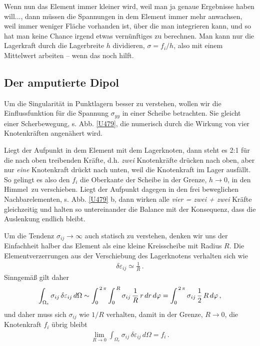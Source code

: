 {Wenn nun das Element immer kleiner wird, weil man ja genaue Ergebnisse haben will..., dann m\"{u}ssen die Spannungen in dem Element immer mehr anwachsen, weil immer weniger Fl\"{a}che vorhanden ist, \"{u}ber die man integrieren kann, und so hat man keine Chance irgend etwas vern\"{u}nftiges zu berechnen. Man kann nur die Lagerkraft durch die Lagerbreite $h$ dividieren, $\sigma = f_i/h$, also mit einem Mittelwert arbeiten -- wenn das noch hilft.



{\textcolor{sectionTitleBlue}{\subsection{Der amputierte Dipol}}}\label{Korrektur22}
Um die Singularit\"{a}t in Punktlagern besser zu verstehen, wollen wir die Einflussfunktion f\"{u}r die Spannung $\sigma_{yy}$ in einer Scheibe betrachten. Sie gleicht einer Scherbewegung, s. Abb. \ref{U479}, die numerisch durch die Wirkung von vier Knotenkr\"{a}ften angen\"{a}hert wird.

Liegt der Aufpunkt in dem Element mit dem Lagerknoten, dann steht es 2:1 f\"{u}r die nach oben treibenden Kr\"{a}fte, d.h. {\em zwei\/} Knotenkr\"{a}fte dr\"{u}cken nach oben, aber nur {\em eine\/} Knotenkraft dr\"{u}ckt nach unten, weil die Knotenkraft im Lager ausf\"{a}llt. So gelingt es also den $f_i$ die Oberkante der Scheibe in der Grenze, $h \to 0$, in \glq den Himmel\grq\ zu verschieben. Liegt der Aufpunkt dagegen in den frei beweglichen Nachbarelementen, s. Abb. \ref{U479} b, dann wirken alle {\em vier = zwei + zwei\/} Kr\"{a}fte gleichzeitig und halten so untereinander die Balance mit der Konsequenz, dass die Auslenkung endlich bleibt.

Um die Tendenz $\sigma_{ij} \to \infty$ auch statisch zu verstehen, denken wir uns der Einfachheit halber das Element als eine kleine Kreisscheibe mit Radius $R$. Die Elementverzerrungen aus der Verschiebung des Lagerknotens verhalten sich wie
\begin{align}
\delta \varepsilon_{ij} \simeq \frac{1}{R}\,.
\end{align}
Sinngem\"{a}{\ss} gilt daher
\begin{align}
 \int_{\Omega_e} \sigma_{ij}\,\delta \varepsilon_{ij}\,d\Omega \sim\int_0^{\,2\,\pi} \int_0^{\,R}   \sigma_{ij}\,\frac{1}{R}\,r\,dr\,d\varphi = \int_0^{\,2\,\pi} \sigma_{ij} \,\frac{1}{2}\,R\,d\varphi\,,
\end{align}
und daher muss sich $\sigma_{ij}$ wie $1/R$ verhalten, damit in der Grenze, $R \to 0$, die Knotenkraft $f_i$ \"{u}brig bleibt
\begin{align}
\lim_{R \to 0} \int_{\Omega_e} \sigma_{ij}\,\delta \varepsilon_{ij}\,d\Omega = f_i\,.
\end{align}


}
